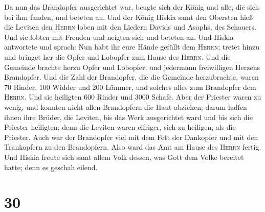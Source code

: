  Da nun das Brandopfer ausgerichtet war, beugte sich der
König und alle, die sich bei ihm fanden, und beteten an. 
Und der König Hiskia samt den Obersten hieß die Leviten den
\textsc{Herrn} loben mit den Liedern Davids und Asaphs, des Schauers.
Und sie lobten mit Freuden und neigten sich und beteten an.
 Und Hiskia antwortete und sprach: Nun habt ihr eure
Hände gefüllt dem \textsc{Herrn}; tretet hinzu und bringet her die Opfer
und Lobopfer zum Hause des \textsc{Herrn}. Und die Gemeinde brachte
herzu Opfer und Lobopfer, und jedermann freiwilligen Herzens Brandopfer.
 Und die Zahl der Brandopfer, die die Gemeinde
herzubrachte, waren 70 Rinder, 100 Widder und 200 Lämmer, und solches
alles zum Brandopfer dem \textsc{Herrn}.  Und sie
heiligten 600 Rinder und 3000 Schafe.  Aber der Priester
waren zu wenig, und konnten nicht allen Brandopfern die Haut abziehen;
darum halfen ihnen ihre Brüder, die Leviten, bis das Werk ausgerichtet
ward und bis sich die Priester heiligten; denn die Leviten waren
eifriger, sich zu heiligen, als die Priester.  Auch war
der Brandopfer viel mit dem Fett der Dankopfer und mit den Trankopfern
zu den Brandopfern. Also ward das Amt am Hause des \textsc{Herrn}
fertig.  Und Hiskia freute sich samt allem Volk dessen,
was Gott dem Volke bereitet hatte; denn es geschah eilend.

\hypertarget{section-29}{%
\section{30}\label{section-29}}

